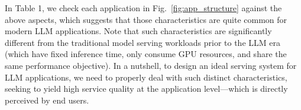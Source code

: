 In Table 1, we check each application in Fig.~\ref{fig:app_structure} against the above aspects, which suggests that those characteristics are quite common for modern LLM applications.
Note that such characteristics are significantly different from the traditional model serving workloads prior to the LLM era~\cite{crankshaw2017clipper,zhang2019mark} (which have fixed inference time, only consume GPU resources, and share the same performance objective).
In a nutshell, to design an ideal serving system for LLM applications, we need to properly deal with such distinct characteristics, seeking to yield high service quality at the application level---which is directly perceived by end users.

